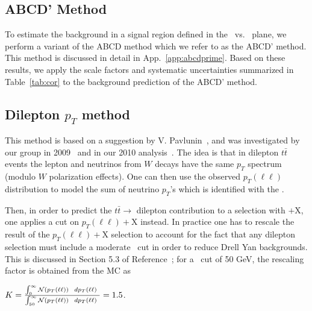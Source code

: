 \clearpage

\subsection{ABCD' Method}

To estimate the background in a signal region defined in the \met\ vs. \Ht\ plane, we perform
a variant of the ABCD method which we refer to as the ABCD' method. This method is discussed in detail
in App.~\ref{app:abcdprime}. 
Based on these results, we apply the scale factors and systematic uncertainties
summarized in Table~\ref{tab:cor} to the background prediction of the ABCD' method.

\subsection{Dilepton $p_T$ method}
\label{sec:victory}
This method is based on a suggestion by V. Pavlunin~\cite{ref:victory},
and was investigated by our group in 2009~\cite{ref:ourvictory} and
in our 2010 analysis~\cite{ref:ospaper}.
The idea is that in dilepton $t\bar{t}$ events the lepton and neutrinos
from $W$ decays have the same $p_T$ spectrum (modulo $W$ polarization 
effects).  One can then use the observed 
$p_T(\ell\ell)$ distribution to model the sum of neutrino $p_T$'s which 
is identified with the \met.

Then, in order to predict the $t\bar{t} \to$ dilepton contribution to a 
selection with \met$+$X, one applies a cut on $p_T(\ell\ell)+$X instead.
In practice one has to rescale the result of the $p_T(\ell\ell)+$X selection
to account for the fact that any dilepton selection must include a 
moderate \met\ cut in order to reduce Drell Yan backgrounds.  This 
is discussed in Section 5.3 of Reference~\cite{ref:ourvictory}; for a \met\
cut of 50 GeV, the rescaling factor is obtained from the MC as

\begin{center}
$ K = \frac{\int_0^{\infty} {\cal N}(p_T(\ell\ell))~~dp_T(\ell\ell)~}{\int_{50}^{\infty} {\cal N}(p_T(\ell\ell))~~dp_T(\ell\ell)~} = 1.5$.
\end{center}

